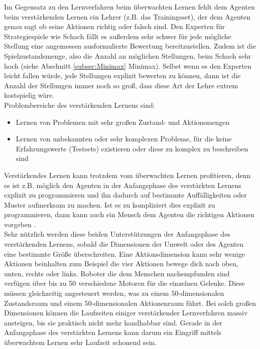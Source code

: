 Im Gegensatz zu den Lernverfahren beim überwachten Lernen fehlt dem Agenten beim verstärkenden Lernen ein Lehrer (z.B. das Trainingsset), der dem Agenten genau sagt ob seine Aktionen richtig oder falsch sind. Den Experten für Strategiespiele wie Schach fällt es außerdem sehr schwer für jede mögliche Stellung eine angemessen ausformulierte Bewertung bereitzustellen. Zudem ist die Spielzustandsmenge, also die Anzahl an möglichen Stellungen, beim Schach sehr hoch (siehe Abschnitt \ref{subsec:Minimax} Minimax). Selbst wenn es den Experten leicht fallen würde, jede Stellungen explizit bewerten zu können, dann ist die Anzahl der Stellungen immer noch so groß, dass diese Art der Lehre extrem kostspielig wäre. \\

Problembereiche des verstärkenden Lernens sind:
\begin{itemize}
\item Lernen von Problemen mit sehr großen Zustand- und Aktionsmengen
\item Lernen von unbekannten oder sehr komplexen Probleme, für die keine Erfahrungswerte (Testsets) existieren oder diese zu komplex zu beschreiben sind 
\end{itemize}

Verstärkendes Lernen kann trotzdem vom überwachten Lernen profitieren, denn es ist z.B. möglich den Agenten in der Anfangsphase des verstärkten Lernens explizit zu programmieren und ihn dadurch auf bestimmte Auffälligkeiten oder Muster aufmerksam zu machen. Ist es zu kompliziert dies explizit zu programmieren, dann kann auch ein Mensch dem Agenten die richtigen Aktionen vorgeben \cite[306]{Ertel}. \\

Sehr nützlich werden diese beiden Unterstützungen der Anfangsphase des verstärkenden Lernens, sobald die Dimensionen der Umwelt oder des Agenten eine bestimmte Größe überschreiten. Eine Aktionsdimension kann sehr wenige Aktionen beinhalten zum Beispiel die vier Aktionen bewege dich nach oben, unten, rechts oder links. Roboter die dem Menschen nachempfunden sind verfügen über bis zu 50 verschiedene Motoren für die einzelnen Gelenke. Diese müssen gleichzeitig angesteuert werden, was zu einem 50-dimensionalen Zustandsraum und einem 50-dimensionalen Aktionenraum führt\cite[\acs{vgl.} 305\psq]{Ertel}. Bei solch großen Dimensionen können die Laufzeiten einiger verstärkender Lernverfahren massiv ansteigen, bis sie praktisch nicht mehr handhabbar sind. Gerade in der Anfangsphase des verstärkten Lernens kann darum ein Eingriff mittels überwachtem Lernen sehr Laufzeit schonend sein. \\

